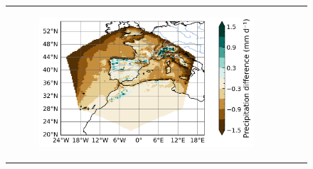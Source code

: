 \begin{figure}[htbp]
\begin{tabular}{ccc}
\begin{subfigure}[b]{0.33\textwidth}
            \includegraphics[width=\textwidth]{images/chap4/domain_size/diff_map_precip_era_LAM_2000km_NBP80.png}
        \end{subfigure} \\
        

\end{tabular}
\end{figure}
